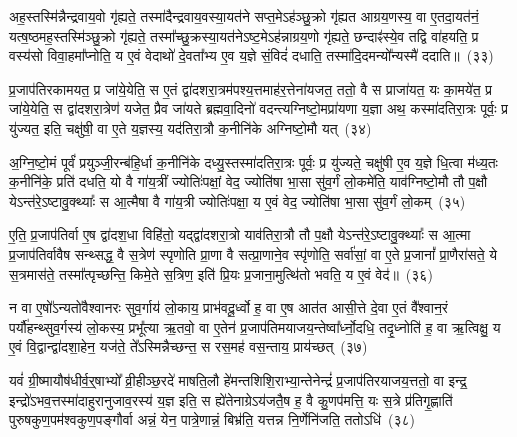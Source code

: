 अह॒स्तस्मि॑न्नैन्द्रवाय॒वो गृ॑ह्यते॒ तस्मा॑दैन्द्रवाय॒वस्या॒यत॑ने सप्त॒मे\-ऽह॑ञ्छु॒क्रो गृ॑ह्यत आग्रय॒णस्य॒ वा ए॒तदा॒यत॑नं॒ यत्ष॒ष्ठमह॒स्तस्मि॑ञ्छु॒क्रो गृ॑ह्यते॒ तस्मा᳚च्छु॒क्रस्या॒यत॑ने\-ऽष्ट॒मे\-ऽह॑न्नाग्रय॒णो गृ॑ह्यते॒ छन्दाꣴ॑स्ये॒व तद्वि वा॑हयति॒ प्र वस्य॑सो विवा॒हमा᳚प्नोति॒ य ए॒वं वेदाथो॑ दे॒वता᳚भ्य ए॒व य॒ज्ञे सं॒विदं॑ दधाति॒ तस्मा॑दि॒दमन्यो᳚न्यस्मै॑ ददाति॥~(३३)\ip

{\anuvakamend[{ए॒तद्वै प॑ञ्च॒मे\-ऽह॒न्त्रैष्टु॑भ ए॒तद्गृ॑ह्यते य॒ज्ञस्य॑ प़ञ्च॒मम॒न्यस्मा॒ एक॑ञ्च}]}

प्र॒जा\-प॑तिरकामयत॒ प्र जा॑ये॒येति॒ स ए॒तं द्वा॑दशरा॒त्रम॑पश्य॒त्तमाह॑र॒त्तेना॑यजत॒ ततो॒ वै स प्राजा॑यत॒ यः का॒मये॑त॒ प्र जा॑ये॒येति॒ स द्वा॑दशरा॒त्रेण॑ यजेत॒ प्रैव जा॑यते ब्रह्मवा॒दिनो॑ वदन्त्यग्निष्टो॒मप्रा॑यणा य॒ज्ञा अथ॒ कस्मा॑दतिरा॒त्रः पूर्वः॒ प्र यु॑ज्यत॒ इति॒ चक्षु॑षी॒ वा ए॒ते य॒ज्ञस्य॒ यद॑तिरा॒त्रौ क॒नीनि॑के अग्निष्टो॒मौ यत्~(३४)\ip

अ॒ग्नि॒ष्टो॒मं पूर्वं॑ प्रयुञ्जी॒रन्ब॑हि॒र्धा क॒नीनि॑के दध्यु॒स्तस्मा॑दतिरा॒त्रः पूर्वः॒ प्र यु॑ज्यते॒ चक्षु॑षी ए॒व य॒ज्ञे धि॒त्वा म॑ध्य॒तः क॒नीनि॑के॒ प्रति॑ दधति॒ यो वै गा॑य॒त्रीं ज्योतिः॑पक्षां॒ वेद॒ ज्योति॑षा भा॒सा सु॑व॒र्गं लो॒कमे॑ति॒ याव॑ग्निष्टो॒मौ तौ प॒क्षौ ये\-ऽन्त॑रे॒\-ऽष्टावु॒क्थ्याः᳚ स आ॒त्मैषा वै गा॑य॒त्री ज्योतिः॑पक्षा॒ य ए॒वं वेद॒ ज्योति॑षा भा॒सा सु॑व॒र्गं लो॒कम्~(३५)\ip

ए॒ति॒ प्र॒जा\-प॑तिर्वा ए॒ष द्वा॑दश॒धा विहि॑तो॒ यद्द्वा॑दशरा॒त्रो याव॑तिरा॒त्रौ तौ प॒क्षौ ये\-ऽन्त॑रे॒\-ऽष्टावु॒क्थ्याः᳚ स आ॒त्मा प्र॒जा\-प॑तिर्वावैष सन्थ्सद्ध॒ वै स॒त्रेण॑ स्पृणोति प्रा॒णा वै सत्प्रा॒णाने॒व स्पृ॑णोति॒ सर्वा॑सां॒ वा ए॒ते प्र॒जानां᳚ प्रा॒णैरा॑सते॒ ये स॒त्रमास॑ते॒ तस्मा᳚त्पृच्छन्ति॒ किमे॒ते स॒त्रिण॒ इति॑ प्रि॒यः प्र॒जाना॒मुत्थि॑तो भवति॒ य ए॒वं वेद॑॥~(३६)\ip

{\anuvakamend[{अ॒ग्नि॒ष्टो॒मौ यथ्सु॑व॒र्गं लो॒कं प्रि॒यः प्र॒जानां॒ पञ्च॑ च}]}

न वा ए॒षो᳚\-ऽन्यतो॑वैश्वानरः सुव॒र्गाय॑ लो॒काय॒ प्राभ॑वदू॒र्ध्वो ह॒ वा ए॒ष आत॑त आसी॒त्ते दे॒वा ए॒तं वै᳚श्वान॒रं पर्यौ॑हन्थ्सुव॒र्गस्य॑ लो॒कस्य॒ प्रभू᳚त्या ऋ॒तवो॒ वा ए॒तेन॑ प्र॒जा\-प॑तिमयाजय॒न्तेष्वा᳚र्ध्नो॒दधि॒ तदृ॒ध्नोति॑ ह॒ वा ऋ॒त्विक्षु॒ य ए॒वं वि॒द्वान्द्वा॑दशा॒हेन॒ यज॑ते॒ ते᳚\-ऽस्मिन्नैच्छन्त॒ स रस॒मह॑ वस॒न्ताय॒ प्राय॑च्छत्~(३७)\ip

यवं॑ ग्री॒ष्मायौष॑धीर्व॒र्॒\mbox{}षाभ्यो᳚ व्री॒हीञ्छ॒रदे॑ माषति॒लौ हे॑मन्तशिशि॒राभ्या॒न्तेनेन्द्रं॑ प्र॒जा\-प॑तिरयाजय॒त्ततो॒ वा इन्द्र॒ इन्द्रो॑\-ऽभव॒त्तस्मा॑दाहुरानुजाव॒रस्य॑ य॒ज्ञ इति॒ स ह्ये॑तेनाग्रे\-ऽय॑जतै॒ष ह॒ वै कु॒णप॑मत्ति॒ यः स॒त्रे प्र॑तिगृ॒ह्णाति॑ पुरुषकुण॒पम॑श्वकुण॒पङ्गौर्वा अन्नं॒ येन॒ पात्रे॒णान्नं॒ बिभ्र॑ति॒ यत्तन्न नि॒र्णेनि॑जति॒ ततो\-ऽधि॑~(३८)\ip

